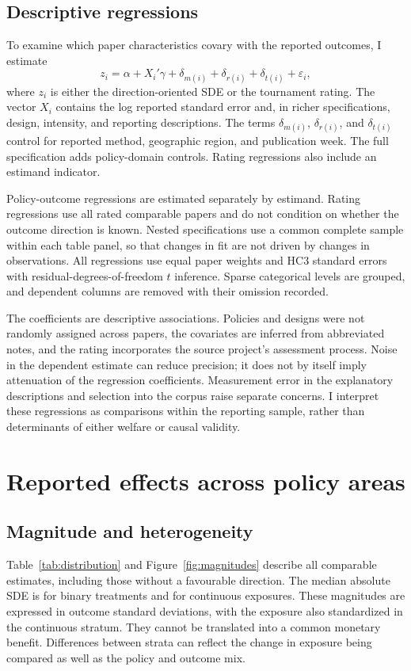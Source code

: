 \documentclass[11pt]{article}
\begin{document}
\subsection{Descriptive regressions}
To examine which paper characteristics covary with the reported outcomes, I estimate
\begin{equation}\label{eq:reg}
 z_i=\alpha+X_i'\gamma+\delta_{m(i)}+\delta_{r(i)}+\delta_{t(i)}+\varepsilon_i,
\end{equation}
where $z_i$ is either the direction-oriented SDE or the tournament rating. The vector $X_i$ contains the log reported standard error and, in richer specifications, design, intensity, and reporting descriptions. The terms $\delta_{m(i)}$, $\delta_{r(i)}$, and $\delta_{t(i)}$ control for reported method, geographic region, and publication week. The full specification adds policy-domain controls. Rating regressions also include an estimand indicator.

Policy-outcome regressions are estimated separately by estimand. Rating regressions use all rated comparable papers and do not condition on whether the outcome direction is known. Nested specifications use a common complete sample within each table panel, so that changes in fit are not driven by changes in observations. All regressions use equal paper weights and HC3 standard errors with residual-degrees-of-freedom $t$ inference. Sparse categorical levels are grouped, and dependent columns are removed with their omission recorded.

The coefficients are descriptive associations. Policies and designs were not randomly assigned across papers, the covariates are inferred from abbreviated notes, and the rating incorporates the source project's assessment process. Noise in the dependent estimate can reduce precision; it does not by itself imply attenuation of the regression coefficients. Measurement error in the explanatory descriptions and selection into the corpus raise separate concerns. I interpret these regressions as comparisons within the reporting sample, rather than determinants of either welfare or causal validity.

\section{Reported effects across policy areas}\label{sec:results}
\subsection{Magnitude and heterogeneity}
Table~\ref{tab:distribution} and Figure~\ref{fig:magnitudes} describe all comparable estimates, including those without a favourable direction. The median absolute SDE is \BinaryMedianAbs{} for binary treatments and \ContinuousMedianAbs{} for continuous exposures. These magnitudes are expressed in outcome standard deviations, with the exposure also standardized in the continuous stratum. They cannot be translated into a common monetary benefit. Differences between strata can reflect the change in exposure being compared as well as the policy and outcome mix.
\end{document}
